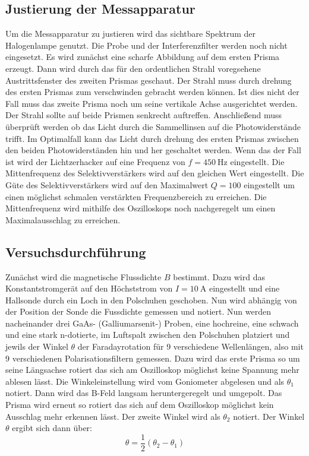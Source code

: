\subsection{Justierung der Messapparatur}
\label{sec:justierung}
Um die Messapparatur zu justieren wird das sichtbare Spektrum der Halogenlampe genutzt. 
Die Probe und der Interferenzfilter werden noch nicht eingesetzt. Es wird zunächst eine
scharfe Abbildung auf dem ersten Prisma erzeugt. Dann wird durch das für den ordentlichen
Strahl voregsehene Austrittsfenster des zweiten Prismas geschaut. Der Strahl muss durch
drehung des ersten Prismas zum verschwinden gebracht werden können. Ist dies nicht der
Fall muss das zweite Prisma noch um seine vertikale Achse ausgerichtet werden. Der Strahl 
sollte auf beide Prismen senkrecht auftreffen. Anschließend muss überprüft werden ob das 
Licht durch die Sammellinsen auf die Photowiderstände trifft. Im Optimalfall kann das Licht 
durch drehung des ersten Prismas zwischen den beiden Photowiderständen hin und her geschaltet werden.
Wenn das der Fall ist wird der Lichtzerhacker auf eine Frequenz von $f=\SI[]{450}[]{\hertz}$ eingestellt.
Die Mittenfrequenz des Selektivverstärkers wird auf den gleichen Wert eingestellt. Die Güte des 
Selektivverstärkers wird auf den Maximalwert $Q=100$ eingestellt um einen möglichst schmalen verstärkten
Frequenzbereich zu erreichen. Die Mittenfrequenz wird mithilfe des Oszilloskops noch nachgeregelt um
einen Maximalausschlag zu erreichen. 

\subsection{Versuchsdurchführung}
\label{sec:versuchsdurchfuehrung}
Zunächst wird die magnetische Flussdichte $B$ bestimmt. Dazu wird das Konstantstromgerät auf den Höchststrom
von $I=\SI[]{10}[]{\ampere}$ eingestellt und eine Hallsonde durch ein Loch in den Polschuhen geschoben. Nun wird 
abhängig von der Position der Sonde die Fussdichte gemessen und notiert. Nun werden nacheinander drei GaAs-
(Galliumarsenit-) Proben, eine hochreine, eine schwach und eine stark n-dotierte, im Luftspalt zwischen den
Polschuhen platziert und jewils der Winkel $\theta$ der Faradayrotation für 9 verschiedene Wellenlängen, also 
mit 9 verschiedenen Polarisationsfiltern gemessen. Dazu wird das erste Prisma so um seine Längsachse rotiert das 
sich am Oszilloskop möglichst keine Spannung mehr ablesen lässt. Die Winkeleinstellung wird vom
Goniometer abgelesen und als $\theta_1$ notiert. Dann wird das B-Feld langsam heruntergeregelt und umgepolt.
Das Prisma wird erneut so rotiert das sich auf dem Oszilloskop möglichst kein Ausschlag mehr erkennen lässt.
Der zweite Winkel wird als $\theta_2$ notiert. Der Winkel $\theta$ ergibt sich dann über:
\begin{equation}
  \label{eq:theta}
  \theta=\frac{1}{2}(\theta_2-\theta_1)
\end{equation} 